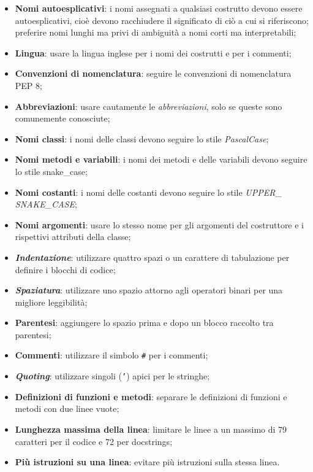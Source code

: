 \documentclass[10pt, a4paper]{article}
\begin{document}
\begin{itemize}
    \item \textbf{Nomi autoesplicativi}: i nomi assegnati a qualsiasi costrutto devono essere autoesplicativi, cioè devono racchiudere il significato di ciò a cui si riferiscono;
    preferire nomi lunghi ma privi di ambiguità a nomi corti ma interpretabili;
    \item \textbf{Lingua}: usare la lingua inglese per i nomi dei costrutti e per i commenti;
    \item \textbf{Convenzioni di nomenclatura}: seguire le convenzioni di nomenclatura PEP 8;
    \item \textbf{Abbreviazioni}: usare cautamente le \textit{abbreviazioni\pg}, solo se queste sono comunemente conosciute;
    \item \textbf{Nomi classi}: i nomi delle classi devono seguire lo stile \textit{PascalCase\pg};
    \item \textbf{Nomi metodi e variabili}: i nomi dei metodi e delle variabili devono seguire lo stile snake\_case;
    \item \textbf{Nomi costanti}: i nomi delle costanti devono seguire lo stile \textit{UPPER\_ SNAKE\_CASE\pg};
    \item \textbf{Nomi argomenti}: usare lo stesso nome per gli argomenti del costruttore e i rispettivi attributi della classe;
    \item \textbf{\textit{Indentazione\pg}}: utilizzare quattro spazi o un carattere di tabulazione per definire i blocchi di codice;
    \item \textbf{\textit{Spaziatura\pg}}: utilizzare uno spazio attorno agli operatori binari per una migliore leggibilità;
    \item \textbf{Parentesi}: aggiungere lo spazio prima e dopo un blocco raccolto tra parentesi;
    \item \textbf{Commenti}: utilizzare il simbolo \texttt{\#} per i commenti;
    \item \textbf{\textit{Quoting\pg}}: utilizzare singoli (\texttt{'}) apici per le stringhe;
    \item \textbf{Definizioni di funzioni e metodi}: separare le definizioni di funzioni e metodi con due linee vuote;
    \item \textbf{Lunghezza massima della linea}: limitare le linee a un massimo di 79 caratteri per il codice e 72 per docstrings;
    \item \textbf{Più istruzioni su una linea}: evitare più istruzioni sulla stessa linea.
\end{itemize}
\end{document}
